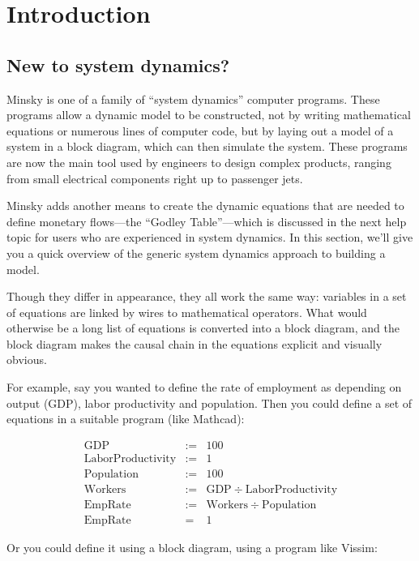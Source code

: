 \chapter{Introduction}
\label{Introduction}

\section{New to system dynamics?}
\label{intro:new}

Minsky is one of a family of ``system dynamics'' computer
programs. These programs allow a dynamic model to be constructed, not
by writing mathematical equations or numerous lines of computer code,
but by laying out a model of a system in a block diagram, which can then
simulate the system. These programs are now the main tool used by
engineers to design complex products, ranging from small electrical
components right up to passenger jets.


Minsky adds another means to create the dynamic equations that are
needed to define monetary flows---the ``Godley Table''---which is
discussed in the next help topic for users who are experienced in
system dynamics. In this section, we'll give you a quick overview of
the generic system dynamics approach to building a model.


Though they differ in appearance, they all work the same way:
variables in a set of equations are linked by wires to mathematical
operators. What would otherwise be a long list of equations is
converted into a block diagram, and the block diagram makes the causal chain
in the equations explicit and visually obvious.

For example, say you wanted to define the rate of employment as
depending on output (GDP), labor productivity and population. Then you
could define a set of equations in a suitable program (like Mathcad):

\begin{eqnarray*}
\mathrm{GDP}&:=&100\\
\mathrm{LaborProductivity}&:=&1\\
\mathrm{Population}&:=&100\\
\mathrm{Workers}&:=&\mathrm{GDP}\div\mathrm{LaborProductivity}\\
\mathrm{EmpRate}&:=&\mathrm{Workers}\div\mathrm{Population}\\
\mathrm{EmpRate}&=&1
\end{eqnarray*}

Or you could define it using a block diagram, using a program like Vissim:

